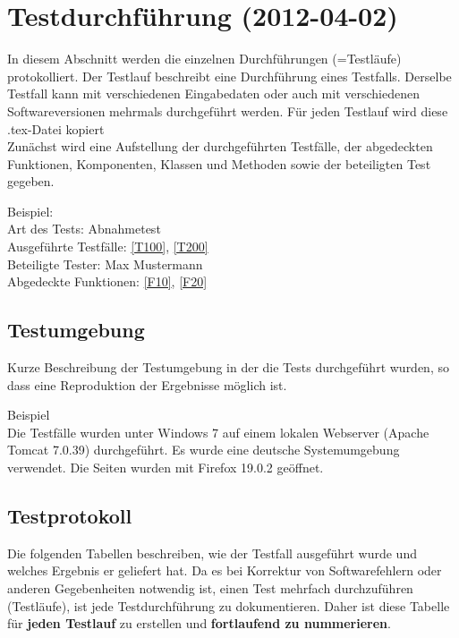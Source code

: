 
\chapter{Testdurchführung (2012-04-02)}

In diesem Abschnitt werden die einzelnen Durchführungen (=Testläufe) protokolliert.
Der Testlauf beschreibt eine Durchführung eines Testfalls. Derselbe
Testfall kann mit verschiedenen Eingabedaten oder auch mit verschiedenen
Softwareversionen mehrmals durchgeführt werden. Für jeden Testlauf wird diese .tex-Datei kopiert\\

Zunächst wird eine Aufstellung der durchgeführten Testfälle, der abgedeckten Funktionen, Komponenten, Klassen und Methoden sowie der beteiligten Test gegeben.

Beispiel:\\
Art des Tests: Abnahmetest\\
Ausgeführte Testfälle: \ref{T100}, \ref{T200}\\ 
Beteiligte Tester: Max Mustermann\\
Abgedeckte Funktionen: \ref{F10}, \ref{F20}

\section{Testumgebung}

Kurze Beschreibung der Testumgebung in der die Tests durchgeführt wurden, so dass eine Reproduktion der Ergebnisse möglich ist.

Beispiel\\
Die Testfälle wurden unter Windows 7 auf einem lokalen Webserver (Apache Tomcat 7.0.39) durchgeführt. Es wurde eine deutsche Systemumgebung verwendet. Die Seiten wurden mit Firefox 19.0.2 geöffnet.

\section{Testprotokoll}

Die folgenden Tabellen beschreiben, wie der Testfall ausgeführt wurde und
welches Ergebnis er geliefert hat. Da es bei Korrektur von Softwarefehlern oder
anderen Gegebenheiten notwendig ist, einen Test mehrfach durchzuführen
(Testläufe), ist jede Testdurchführung zu dokumentieren. Daher ist diese
Tabelle für \textbf{jeden Testlauf} zu erstellen und \textbf{fortlaufend zu
nummerieren}. \\

